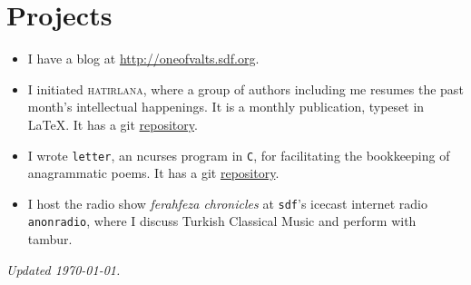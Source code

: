 \documentclass[11pt, a4paper, twocolumn]{memoir}
\begin{document}
\section*{Projects}
\begin{itemize}[leftmargin=*]
  \item I have a blog at \url{http://oneofvalts.sdf.org}.
  \item I initiated \textsc{hatirlana}, where a group of authors including me
  resumes the past month's intellectual happenings. It is a monthly
  publication, typeset in \LaTeX. It has a git
  \href{https://github.com/oneofvalts/hatirlana}{repository}.
  \item I wrote \texttt{letter}, an ncurses program in \texttt{C}, for
  facilitating the bookkeeping of anagrammatic poems. It has a git
  \href{https://github.com/oneofvalts/letter}{repository}.
  \item I host the radio show \textit{ferahfeza chronicles} at \texttt{sdf}'s
  icecast internet radio \texttt{anonradio}, where I discuss Turkish
  Classical Music and perform with tambur.
\end{itemize}
\vfill\hfill{}\tiny\textit{Updated \today.}
\end{document}
